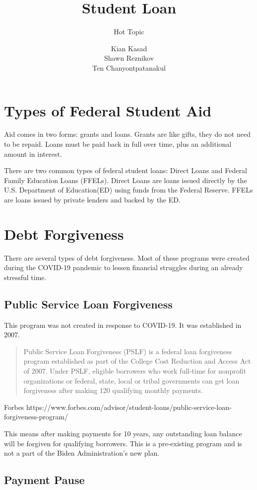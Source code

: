 \documentclass{../khw}
\title{Student Loan}{Debt Forgiveness}
\subtitle{Hot Topic}
\author{
    Kian Kasad\\[4pt]
    Shawn Reznikov\\[4pt]
    Ten Chanyontpatanakul
}
\newcommand{\ed}{Department of Education}
\newcommand{\used}{U.S. \ed}
\begin{document}
\maketitle

\section{Types of Federal Student Aid}

Aid comes in two forms: grants and loans. Grants are like gifts, they do not
need to be repaid. Loans must be paid back in full over time, plus an additional
amount in interest.

There are two common types of federal student loans: Direct Loans and Federal
Family Education Loans (FFELs). Direct Loans are loans issued directly by the
\used (ED) using funds from the Federal Reserve. FFELs are loans issued by
private lenders and backed by the ED.

\section{Debt Forgiveness}

There are several types of debt forgiveness. Most of these programs were created
during the COVID-19 pandemic to lessen financial struggles during an already
stressful time.

\subsection{Public Service Loan Forgiveness}

This program was not created in response to COVID-19. It was
established in 2007.

\blockquote{
    Public Service Loan Forgiveness (PSLF) is a federal loan forgiveness program
    established as part of the College Cost Reduction and Access Act of 2007.
    Under PSLF, eligible borrowers who work full-time for nonprofit
    organizations or federal, state, local or tribal governments can get loan
    forgiveness after making 120 qualifying monthly payments.
}{Forbes}%
{https://www.forbes.com/advisor/student-loans/public-service-loan-forgiveness-program/}

This means after making payments for 10 years, any outstanding loan balance will
be forgiven for qualifying borrowers. This is a pre-existing program and is not
a part of the Biden Administration's new plan.


\subsection{Payment Pause}
\end{document}

